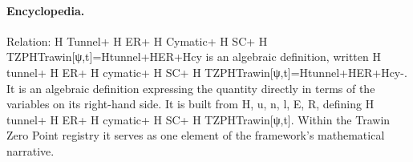 \paragraph{Encyclopedia.}
Relation: H Tunnel+ H ER+ H Cymatic+ H SC+ H TZPHTrawin[ψ,t]=Htunnel+HER+Hcy is an algebraic definition, written H tunnel+ H ER+ H cymatic+ H SC+ H TZPHTrawin[ψ,t]=Htunnel+HER+Hcy-. It is an algebraic definition expressing the quantity directly in terms of the variables on its right-hand side. It is built from H, u, n, l, E, R, defining H tunnel+ H ER+ H cymatic+ H SC+ H TZPHTrawin[ψ,t]. Within the Trawin Zero Point registry it serves as one element of the framework's mathematical narrative.
